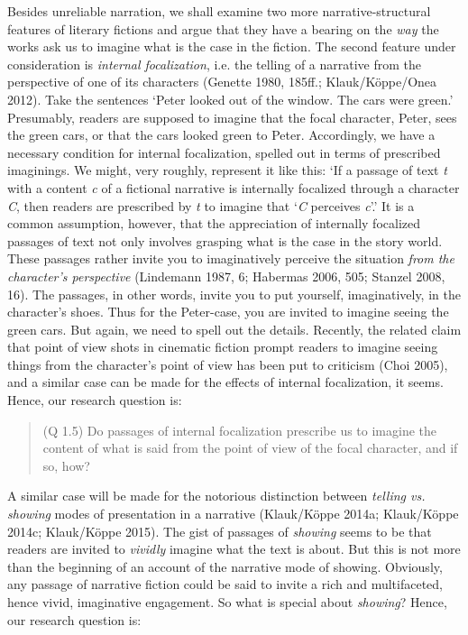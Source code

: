 \noindent Besides unreliable narration, we shall examine two more
narrative-structural features of literary fictions and argue that they
have a bearing on the \emph{way} the works ask us to imagine what is the
case in the fiction. The second feature under consideration is
\emph{internal focalization}, i.e. the telling of a narrative from the
perspective of one of its characters (Genette 1980, 185ff.;
Klauk/K\"oppe/Onea 2012). Take the sentences `Peter looked out of the
window. The cars were green.' Presumably, readers are supposed to
imagine that the focal character, Peter, sees the green cars, or that
the cars looked green to Peter. Accordingly, we have a necessary
condition for internal focalization, spelled out in terms of prescribed
imaginings. We might, very roughly, represent it like this: `If a
passage of text \emph{t} with a content \emph{c} of a fictional
narrative is internally focalized through a character \emph{C}, then
readers are prescribed by \emph{t} to imagine that `\emph{C} perceives
\emph{c}'.' It is a common assumption, however, that the appreciation of
internally focalized passages of text not only involves grasping what is
the case in the story world. These passages rather invite you to
imaginatively perceive the situation \emph{from the character's
perspective} (Lindemann 1987, 6; Habermas 2006, 505; Stanzel 2008, 16).
The passages, in other words, invite you to put yourself, imaginatively,
in the character's shoes. Thus for the Peter-case, you are invited to
imagine seeing the green cars. But again, we need to spell out the
details. Recently, the related claim that point of view shots in
cinematic fiction prompt readers to imagine seeing things from the
character's point of view has been put to criticism (Choi 2005), and a
similar case can be made for the effects of internal focalization, it
seems. Hence, our research question is:

\vspace{-.2cm}
\begin{quote}
(Q 1.5) Do passages of internal focalization prescribe us to imagine
the content of what is said from  the point of view of the focal
character, and if so, how? 
\end{quote}
\vspace{-.2cm}

\noindent A similar case will be made for the notorious distinction between
\emph{telling vs. showing} modes of presentation in a narrative
(Klauk/K\"oppe 2014a; Klauk/K\"oppe 2014c; Klauk/K\"oppe 2015). The gist of
passages of \emph{showing} seems to be that readers are invited to
\emph{vividly} imagine what the text is about. But this is not more than
the beginning of an account of the narrative mode of showing. Obviously,
any passage of narrative fiction could be said to invite a rich and
multifaceted, hence vivid, imaginative engagement. So what is special
about \emph{showing}? Hence, our research question is:


